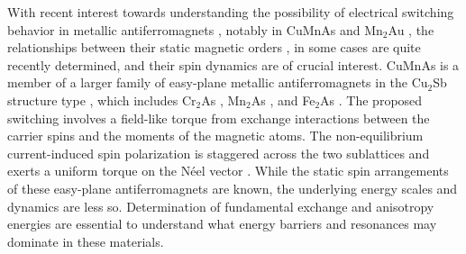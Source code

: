 \documentclass[10pt,doublespacing,edeposit]{uiucthesis2020}
\begin{document}
\begin{mainmatter}
With recent interest towards understanding the possibility of electrical switching behavior in metallic antiferromagnets \cite{Baltz2018,Siddiqui2020,Jungfleisch2018,Zelezny2018}, notably in CuMnAs \cite{Wadley2016,Grzybowski2017,Wadley2018,Matalla-Wagner2019} and Mn$_2$Au \cite{Meinert2018,Bodnar2019}, the relationships between their static magnetic orders \cite{Wadley2013,Hills2015,Wadley2015,Saidl2017}, in some cases are quite recently determined, and their spin dynamics \cite{Grzybowski2017,Bodnar2019,Yang2019,Yang2020} are of crucial interest. CuMnAs is a member of a larger family of easy-plane metallic antiferromagnets in the Cu$_2$Sb structure type \cite{Nateprov2011,Wadley2013}, which includes Cr$_2$As \cite{Yuzuri1960Cr2As}, Mn$_2$As \cite{Yuzuri1960}, and Fe$_2$As \cite{Katsuraki1966}.
The proposed switching involves a field-like torque from exchange interactions between the carrier spins and the moments of the magnetic atoms. The non-equilibrium current-induced spin polarization is staggered across the two sublattices and exerts a uniform torque on the N\'{e}el vector \cite{Zelezny2014,Zelezny2017,Wadley2016}.
While the static spin arrangements of these easy-plane antiferromagnets are known, the underlying energy scales and dynamics are less so. 
Determination of fundamental exchange and anisotropy energies are essential to understand what energy barriers and resonances may dominate in these materials.



\end{mainmatter}
\end{document}
